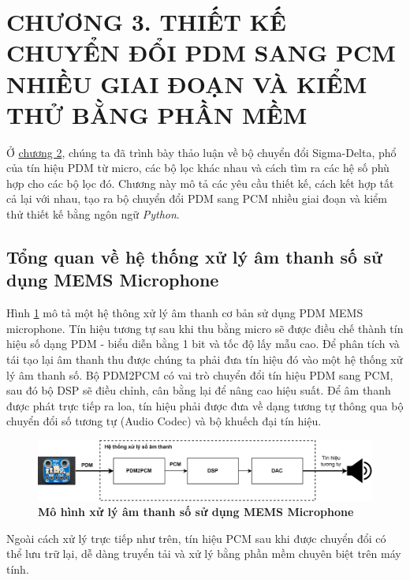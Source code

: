 \section*{CHƯƠNG 3. THIẾT KẾ CHUYỂN ĐỔI PDM SANG PCM NHIỀU GIAI ĐOẠN VÀ KIỂM THỬ BẰNG PHẦN MỀM} \label{chuong3}
\setcounter{section}{3}
\setcounter{subsection}{0}
\setcounter{figure}{0}
\setcounter{table}{0}
Ở \hyperref[chuong2]{chương 2}, chúng ta đã trình bày thảo luận về bộ chuyển đổi Sigma-Delta, phổ của tín hiệu PDM từ micro, các bộ lọc khác nhau và cách tìm ra các hệ số phù hợp cho các bộ lọc đó. Chương này mô tả các yêu cầu thiết kế, cách kết hợp tất cả lại với nhau, tạo ra bộ chuyển đổi PDM sang PCM nhiều giai đoạn và kiểm thử thiết kế bằng ngôn ngữ \textit{Python}.
\subsection{Tổng quan về hệ thống xử lý âm thanh số sử dụng MEMS Microphone}
Hình \ref{audio_top} mô tả một hệ thông xử lý âm thanh cơ bản sử dụng PDM MEMS microphone. Tín hiệu tương tự sau khi thu bằng micro sẽ được điều chế thành tín hiệu số dạng PDM - biểu diễn bằng 1 bit và tốc độ lấy mẫu cao. Để phân tích và tái tạo lại âm thanh thu được chúng ta phải đưa tín hiệu đó vào một hệ thống xử lý âm thanh số. Bộ PDM2PCM có vai trò chuyển đổi tín hiệu PDM sang PCM, sau đó bộ DSP sẽ điều chỉnh, cân bằng lại để nâng cao hiệu suất. Để âm thanh được phát trực tiếp ra loa, tín hiệu phải được đưa về dạng tương tự thông qua bộ chuyển đổi số tương tự (Audio Codec) và bộ khuếch đại tín hiệu.
\begin{figure}[H]
    \centering
    \includegraphics[width=14cm]{Images/Chuong3/MoDau/audio_top.png}
    \caption[Sơ đồ tổng quát của bộ chuyển đổi]{\bfseries \fontsize{12pt}{0pt}\selectfont Mô hình xử lý âm thanh số sử dụng MEMS Microphone}
    \label{audio_top}
\end{figure}

Ngoài cách xử lý trực tiếp như trên, tín hiệu PCM sau khi được chuyển đổi có thể lưu trữ lại, dễ dàng truyển tải và xử lý bằng phần mềm chuyên biệt trên máy tính.

